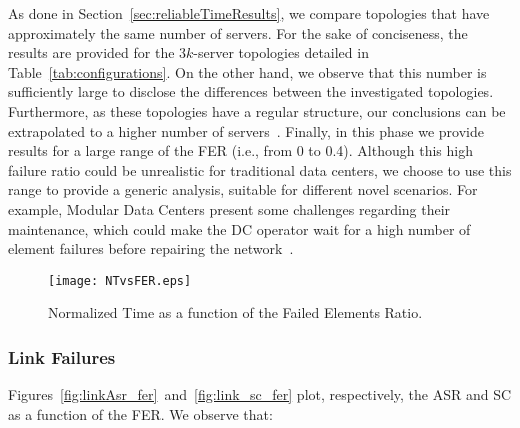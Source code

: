 As done in Section~\ref{sec:reliableTimeResults}, we compare topologies that have approximately the same number of servers. For the sake of conciseness, the results are provided for the $3k$-server topologies detailed in Table~\ref{tab:configurations}. On the other hand, we observe that this number is sufficiently large to disclose the differences between the investigated topologies. Furthermore, as these topologies have a regular structure, our conclusions can be extrapolated to a higher number of servers~\cite{bilal2013Characterization}.
Finally, in this phase we provide results for a large range of the FER (i.e., from 0 to 0.4). Although this high failure ratio could be unrealistic for traditional data centers, we choose to use this range 
to provide a generic analysis, suitable for different novel scenarios. For example, Modular Data Centers present some challenges regarding their maintenance, which could make the DC operator wait for a high number of element failures before repairing the network~\cite{guo2009bcube}.
\begin{figure}
\centering
\texttt{[image: NTvsFER.eps]}
\caption{Normalized Time as a function of the Failed Elements Ratio.}
\label{fig:FER_elapsedTime}
\end{figure}
\subsubsection{Link Failures}
\label{sec:perfEvaluationLinkSurvival}

Figures~\ref{fig:linkAsr_fer}~and~\ref{fig:link_sc_fer} plot, respectively, the ASR and SC as a function of the FER. We observe that:

